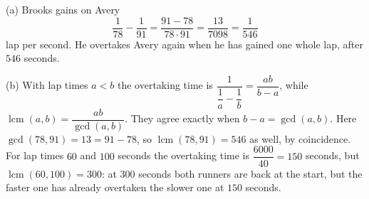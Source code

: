 (a) Brooks gains on Avery
\[
\dfrac{1}{78}-\dfrac{1}{91}=\dfrac{91-78}{78\cdot91}=\dfrac{13}{7098}=\dfrac{1}{546}
\]
lap per second. He overtakes Avery again when he has gained one whole lap, after $\boxed{546}$ seconds.

(b) With lap times $a<b$ the overtaking time is $\dfrac{1}{\dfrac{1}{a}-\dfrac{1}{b}}=\dfrac{ab}{b-a}$, while $\operatorname{lcm}(a,b)=\dfrac{ab}{\gcd(a,b)}$. They agree exactly when $b-a=\gcd(a,b)$. Here $\gcd(78,91)=13=91-78$, so $\operatorname{lcm}(78,91)=546$ as well, by coincidence. For lap times $60$ and $100$ seconds the overtaking time is $\dfrac{6000}{40}=150$ seconds, but $\operatorname{lcm}(60,100)=300$: at $300$ seconds both runners are back at the start, but the faster one has already overtaken the slower one at $150$ seconds.
